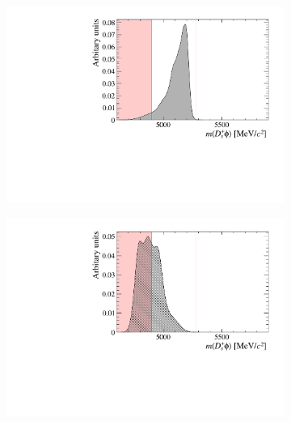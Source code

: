 \begin{figure}[!h]
    \centering
    \begin{subfigure}[t]{0.49\textwidth}
        \includegraphics[width=1.0\textwidth]{figs/B2DsPhi/Bs2Dsa1_4600_5900_Shape.pdf}
        \caption{\decay{\Bsb}{\Dsp\Km\Kstarz} }
    \end{subfigure}
    \begin{subfigure}[t]{0.49\textwidth}
        \includegraphics[width=1.0\textwidth]{figs/B2DsPhi/Bs2DsstKKst_4600_5900_Shape.pdf}
        \caption{\decay{\Bsb}{\Dsp\Km\Kstarz} }
    \end{subfigure}
    \begin{subfigure}[t]{0.49\textwidth}

\end{subfigure}
\end{figure}
